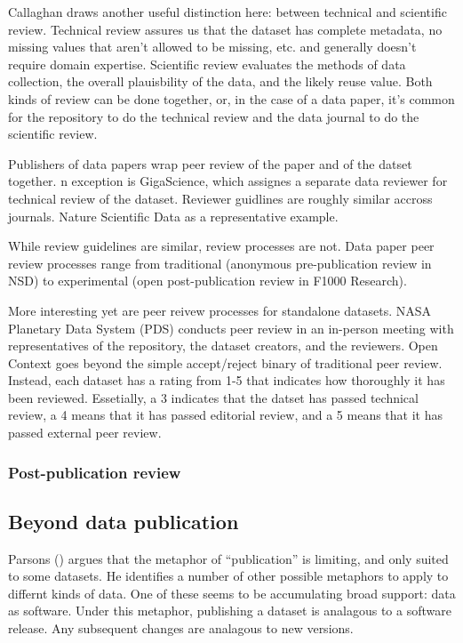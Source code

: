 \documentclass[10pt,a4paper,twocolumn]{article}
\begin{document}
Callaghan draws another useful distinction here: between technical and scientific review. \cite{callaghan_making_2012}
Technical review assures us that the dataset has complete metadata, no missing values that aren't allowed to be missing, etc. and generally doesn't require domain expertise. 
Scientific review evaluates the methods of data collection, the overall plauisbility of the data, and the likely reuse value. 
Both kinds of review can be done together, or, in the case of a data paper, it's common for the repository to do the technical review and the data journal to do the scientific review.

Publishers of data papers wrap peer review of the paper and of the datset together. 
n exception is GigaScience, which assignes a separate data reviewer for technical review of the dataset. 
Reviewer guidlines are roughly similar accross journals. Nature Scientific Data as a representative example.

While review guidelines are similar, review processes are not. 
Data paper peer review processes range from traditional (anonymous pre-publication review in NSD) to experimental (open post-publication review in F1000 Research).

More interesting yet are peer reivew processes for standalone datasets. 
NASA Planetary Data System (PDS) conducts peer review in an in-person meeting with representatives of the repository, the dataset creators, and the reviewers. 
Open Context goes beyond the simple accept/reject binary of traditional peer review. 
Instead, each dataset has a rating from 1-5 that indicates how thoroughly it has been reviewed. 
Essetially, a 3 indicates that the datset has passed technical review, a 4 means that it has passed editorial review, and a 5 means that it has passed external peer review.

\subsubsection{Post-publication review}\label{post-publication-review}

\subsection*{Beyond data publication}\label{beyond-data-publication}

Parsons () argues that the metaphor of ``publication'' is limiting, and only suited to some datasets. 
He identifies a number of other possible metaphors to apply to differnt kinds of data. One of these seems to be accumulating broad support: data as software. 
Under this metaphor, publishing a dataset is analagous to a software release. 
Any subsequent changes are analagous to new versions.
\end{document}
